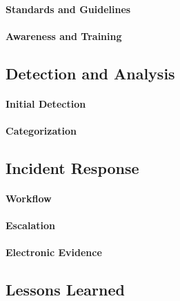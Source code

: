 \paragraph{Standards and Guidelines}
\paragraph{Awareness and Training}

\subsection{Detection and Analysis}



\paragraph{Initial Detection}
\paragraph{Categorization}

\subsection{Incident Response}
\paragraph{Workflow}
\paragraph{Escalation}
\paragraph{Electronic Evidence}

\subsection{Lessons Learned}
